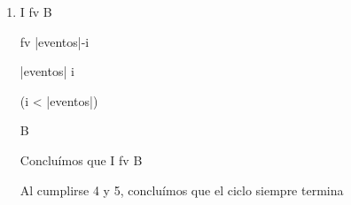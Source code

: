 \documentclass[10pt,a4paper]{article}
\begin{document}
\begin{enumerate}
		\equiv eventos[i]=true \yLuego (eventos[i]=true \yLuego |eventos|-(i+1) < v_0) \vee (eventos[i]=false \yLuego |eventos|-(i+1) < v_0)
		\vspace{2mm}
	
		\equiv (eventos[i]=true \vee eventos[i]=false) \wedge |eventos|-(i+1) < v_0
		\vspace{2mm}
	
		\equiv |eventos|-(i+1) < v_0
		\vspace{2mm}
	
		fv=v_0 \hspace{3} equivale \hspace{3} a \hspace{3} |eventos|-i, entonces \hspace{3} reemplazamos \hspace{3} v_0 \hspace{3} con \hspace{3} esa \hspace{3} expresión:
		\vspace{2mm}
	
		\equiv |eventos|-(i+1) < |eventos|-i
		\vspace{2mm}
	
		\equiv -(i+1) < -i
		\vspace{2mm}
	
		\equiv i+1 > i
		\vspace{2mm}
	
		Concluímos que {\{I \wedge B\ \wedge fv=v_0\} \hspace{2} S \hspace{2} \{fv<v_0\}}
		\vspace{2mm}
	
		\item I \wedge fv  \implica \neg B
		\vspace{2mm}
	
		fv  \equiv |eventos|-i 
		\vspace{2mm}
	
		\hspace{27} \equiv |eventos| \leq i
		\vspace{2mm}
	
		\hspace{19} \implica \hspace{2} \neg (i < |eventos|)
		\vspace{2mm}
	
		\hspace{27} \equiv \neg B
		\vspace{2mm}
	
		{Concluímos que I \wedge fv  \implica \neg B}
		\vspace{2mm}
	
		{Al cumplirse 4 y 5, concluímos que el ciclo siempre termina}
		
	\end{enumerate}
	
\end{document}
